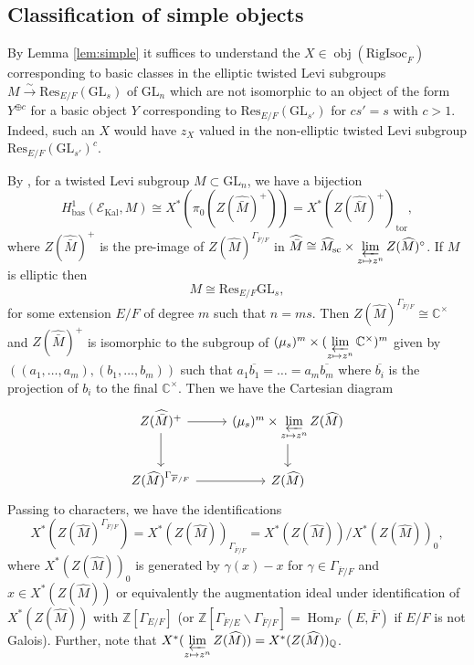 \documentclass[11pt]{amsart}
\theoremstyle{definition}
\newcommand{\mc}{\mathcal}
\newcommand{\Z}{\mathbb{Z}}
\newcommand{\C}{\mathbb{C}}
\newcommand{\Q}{\mathbb{Q}}
\newcommand{\ov}{\overline}
\newcommand{\Res}{\mathrm{Res}}
\newcommand{\RigIsoc}{\mathrm{RigIsoc}}
\newcommand{\GL}{\mathrm{GL}}
\DeclareMathOperator{\Kal}{Kal}
\DeclareMathOperator{\Ob}{obj}
\DeclareMathOperator{\bas}{bas}
\DeclareMathOperator{\msc}{sc}
\DeclareMathOperator{\tor}{tor}
\DeclareMathOperator{\Hom}{Hom}
\newcommand{\wh}{\widehat}
\begin{document}
\subsection{Classification of simple objects}
By Lemma \ref{lem:simple} it suffices to understand the $X \in \Ob(\RigIsoc_{F})$ corresponding to basic classes in the elliptic twisted Levi subgroups $M \xrightarrow{\sim} \Res_{E/F}(\GL_{s})$ of $\GL_n$ which are not isomorphic to an object of the form $Y^{\oplus c}$ for a basic object $Y$ corresponding to $\Res_{E/F}(\GL_{s'})$ for $cs' = s$ with $c>1$. Indeed, such an $X$ would have $z_{X}$ valued in the non-elliptic twisted Levi subgroup $\Res_{E/F}(\GL_{s'})^{c}$.

By \cite[Corollary 5.4]{Kalannals}, for a twisted Levi subgroup $M \subset \GL_n$, we have a bijection
\begin{equation}\label{TNM}
    H^1_{\bas}(\mc{E}_{\Kal}, M) \cong X^{\ast}(\pi_0(Z(\wh{\bar{M}})^+))=X^{\ast}(Z(\wh{\bar{M}})^+)_{\tor} ,
\end{equation}
where $Z(\wh{\bar{M}})^+$ is the pre-image of $Z(\wh{M})^{\Gamma_{\ov{F}/F}}$ in $\wh{\bar{M}} \cong \wh{M}_{\msc} \times \varprojlim\limits_{z \mapsto z^n} Z(\wh{M})^{\circ}$.
If $M$ is elliptic then 
\begin{equation*}
    M \cong \Res_{E/F} \GL_{s},
\end{equation*}
for some extension $E/F$ of degree $m$ such that $n=ms$.
Then $Z(\wh{M})^{\Gamma_{\ov{F}/F}} \cong \C^{\times}$ and $Z(\wh{\bar{M}})^+$ is isomorphic to the subgroup of $(\mu_s)^m \times (\varprojlim\limits_{z \mapsto z^n} \C^{\times})^m$ given by $((a_1,\dots,a_m), (b_1, \dots , b_m))$ such that $a_1\ov{b_1}= \dots =a_m\ov{b_m}$ where $\ov{b_i}$ is the projection of $b_i$ to the final $\C^{\times}$. Then we have the Cartesian diagram
\begin{equation*}
    \begin{tikzcd}
Z(\wh{\bar{M}})^+ \arrow[r] \arrow[d] & (\mu_s)^m \times \varprojlim\limits_{z \mapsto z^n} Z(\wh{M}) \arrow[d]  \\
Z(\wh{M})^{\Gamma_{\ov{F}/{F}}} \arrow[r] & Z(\wh{M})
    \end{tikzcd}
\end{equation*}
Passing to characters, we have the identifications
\begin{equation*}
    X^{\ast}(Z(\wh{M})^{\Gamma_{\ov{F}/F}}) = X^{\ast}(Z(\wh{M}))_{\Gamma_{\ov{F}/F}} = X^{\ast}(Z(\wh{M}))/ X^{\ast}(Z(\wh{M}))_0,
\end{equation*}
where $X^{\ast}(Z(\wh{M}))_0$ is generated by $\gamma(x) - x$ for $\gamma \in \Gamma_{\ov{F}/F}$ and $x \in X^{\ast}(Z(\wh{M}))$ or equivalently the augmentation ideal under identification of $X^{\ast}(Z(\wh{M}))$ with $\Z[\Gamma_{E/F}]$ (or $\Z[\Gamma_{\ov{F}/E} \backslash \Gamma_{\ov{F}/F}] = \Hom_{F}(E,\ov{F})$ if $E/F$ is not Galois). Further, note that $X^{\ast}(\varprojlim\limits_{z \mapsto z^n} Z(\wh{M})) = X^{\ast}(Z(\wh{M}))_{\Q}$.
\end{document}

